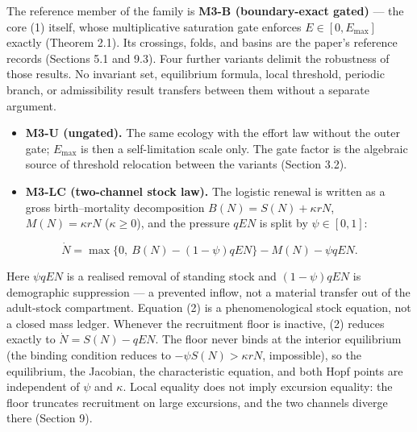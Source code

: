 \documentclass[11pt]{article}
\begin{document}
The reference member of the family is \textbf{M3-B (boundary-exact
gated)} --- the core (1) itself, whose multiplicative saturation gate
enforces \(E \in [0, E_{\max}]\) exactly (Theorem 2.1). Its crossings,
folds, and basins are the paper's reference records (Sections 5.1 and
9.3). Four further variants delimit the robustness of those results. No
invariant set, equilibrium formula, local threshold, periodic branch, or
admissibility result transfers between them without a separate argument.

\begin{itemize}
\item
  \textbf{M3-U (ungated).} The same ecology with the effort law without
  the outer gate; \(E_{\max}\) is then a self-limitation scale only. The
  gate factor is the algebraic source of threshold relocation between
  the variants (Section 3.2).
\item
  \textbf{M3-LC (two-channel stock law).} The logistic renewal is
  written as a gross birth--mortality decomposition
  \(B(N) = S(N) + \kappa rN\), \(M(N) = \kappa rN\) (\(\kappa \ge 0\)),
  and the pressure \(qEN\) is split by \(\psi \in [0,1]\):
\end{itemize}

\[\dot N = \max\{0,\ B(N) - (1-\psi)qEN\} - M(N) - \psi qEN. \tag{2}\]

Here \(\psi qEN\) is a realised removal of standing stock and
\((1-\psi)qEN\) is demographic suppression --- a prevented inflow, not a
material transfer out of the adult-stock compartment. Equation (2) is a
phenomenological stock equation, not a closed mass ledger. Whenever the
recruitment floor is inactive, (2) reduces exactly to
\(\dot N = S(N) - qEN\). The floor never binds at the interior
equilibrium (the binding condition reduces to
\(-\psi S(N) > \kappa rN\), impossible), so the equilibrium, the
Jacobian, the characteristic equation, and both Hopf points are
independent of \(\psi\) and \(\kappa\). Local equality does not imply
excursion equality: the floor truncates recruitment on large excursions,
and the two channels diverge there (Section 9).
\end{document}
